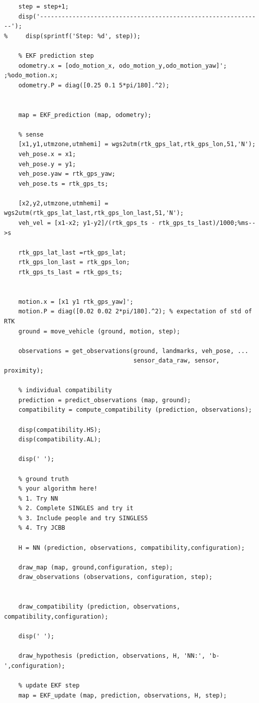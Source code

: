 \documentclass[12pt,a4paper]{article}
\begin{document}
{{{\begin{verbatim}
    step = step+1;
    disp('--------------------------------------------------------------');
%     disp(sprintf('Step: %d', step));
    
    % EKF prediction step
    odometry.x = [odo_motion_x, odo_motion_y,odo_motion_yaw]'; ;%odo_motion.x;
    odometry.P = diag([0.25 0.1 5*pi/180].^2);

   
    map = EKF_prediction (map, odometry);    

    % sense
    [x1,y1,utmzone,utmhemi] = wgs2utm(rtk_gps_lat,rtk_gps_lon,51,'N');
    veh_pose.x = x1;
    veh_pose.y = y1;
    veh_pose.yaw = rtk_gps_yaw;
    veh_pose.ts = rtk_gps_ts;

    [x2,y2,utmzone,utmhemi] = wgs2utm(rtk_gps_lat_last,rtk_gps_lon_last,51,'N');
    veh_vel = [x1-x2; y1-y2]/(rtk_gps_ts - rtk_gps_ts_last)/1000;%ms-->s

    rtk_gps_lat_last =rtk_gps_lat;
    rtk_gps_lon_last = rtk_gps_lon;
    rtk_gps_ts_last = rtk_gps_ts; 


    motion.x = [x1 y1 rtk_gps_yaw]';
    motion.P = diag([0.02 0.02 2*pi/180].^2); % expectation of std of RTK   
    ground = move_vehicle (ground, motion, step);    

    observations = get_observations(ground, landmarks, veh_pose, ...
                                    sensor_data_raw, sensor, proximity);
    
    % individual compatibility
    prediction = predict_observations (map, ground);
    compatibility = compute_compatibility (prediction, observations);

    disp(compatibility.HS);
    disp(compatibility.AL);

    disp(' ');
    
    % ground truth
    % your algorithm here!
    % 1. Try NN
    % 2. Complete SINGLES and try it
    % 3. Include people and try SINGLES5
    % 4. Try JCBB
    
    H = NN (prediction, observations, compatibility,configuration);

    draw_map (map, ground,configuration, step);
    draw_observations (observations, configuration, step);
    
    
    draw_compatibility (prediction, observations, compatibility,configuration);

    disp(' ');
    
    draw_hypothesis (prediction, observations, H, 'NN:', 'b-',configuration);

    % update EKF step
    map = EKF_update (map, prediction, observations, H, step);
    


\end{verbatim}}}}
\end{document}
